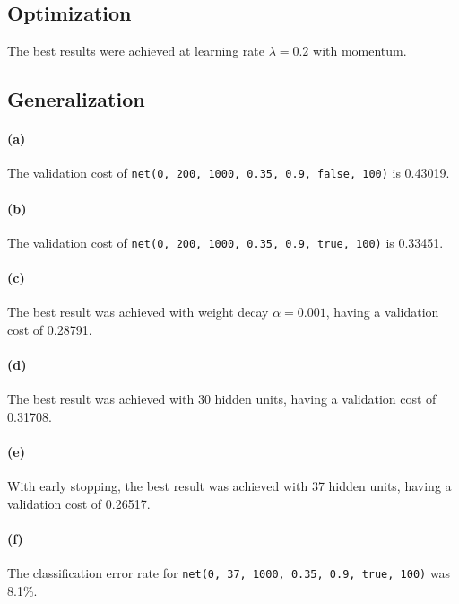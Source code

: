 \documentclass[a4paper,11pt]{article}
\begin{document}
\subsection{Optimization}

The best results were achieved at learning rate $\lambda=0.2$ with momentum.

\subsection{Generalization}
\paragraph{(a)}
The validation cost of \texttt{net(0, 200, 1000, 0.35, 0.9, false, 100)} is 0.43019.
\paragraph{(b)}
The validation cost of \texttt{net(0, 200, 1000, 0.35, 0.9, true, 100)} is 0.33451.
\paragraph{(c)}
The best result was achieved with weight decay $\alpha=0.001$, having a validation cost of 0.28791.
\paragraph{(d)}
The best result was achieved with 30 hidden units, having a validation cost of 0.31708.
\paragraph{(e)}
With early stopping, the best result was achieved with 37 hidden units, having a validation cost of 0.26517.
\paragraph{(f)}
The classification error rate for \texttt{net(0, 37, 1000, 0.35, 0.9, true, 100)} was 8.1\%.
\end{document}
